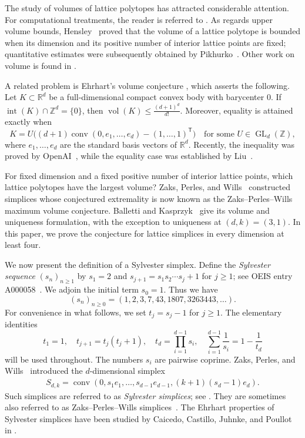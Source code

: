 \documentclass[reqno, 11pt]{article}
\numberwithin{equation}{section}
\theoremstyle{definition}
\DeclareMathOperator{\conv}{conv}
\begin{document}
The study of volumes of lattice polytopes has attracted considerable
attention. For computational treatments, the reader is referred to
\cite{BBCVVolum,DeLoera}.
As regards upper volume bounds, Hensley~\cite[Theorem~3.6]{Hensley1983}
proved that the volume of a lattice polytope is bounded when its
dimension and its positive number of interior lattice points are fixed;
quantitative estimates were subsequently obtained by
Pikhurko~\cite{Pikhurko2001}.
Other work on volume is found in \cite{Bau25,Nill07}.

A related problem is Ehrhart's volume conjecture
\cite{EhrhartVolume,BNillPaffenhonlz}, which asserts the following.
Let $K\subset\mathbb R^d$ be a full-dimensional compact convex body
with barycenter $0$. If $\operatorname{int}(K)\cap\mathbb Z^d=\{0\}$,
then $\operatorname{vol}(K)\leq\frac{(d+1)^d}{d!}$.
Moreover, equality is attained exactly when 
\[
 K=U\bigl((d+1)\conv(0,e_1,\ldots,e_d)-(1,\ldots,1)^{\mathsf{T}}\bigr)
 \quad\text{for some }U\in\operatorname{GL}_d(\mathbb Z),
\]
where $e_1,\ldots,e_d$ are the standard basis vectors of $\mathbb R^d$.
Recently, the inequality was proved by
\mbox{OpenAI}~\cite[Chapter~8, Theorem~1.1]{OAI26}, while the equality case
was established by Liu~\cite[Theorem~1.3]{LiuJiHao}.

For fixed dimension and a fixed positive number of interior lattice
points, which lattice polytopes have the largest volume?
Zaks, Perles, and Wills~\cite{ZPW1982} constructed simplices whose
conjectured extremality is now known as the Zaks--Perles--Wills maximum
volume conjecture.
Balletti and Kasprzyk~\cite[Conjecture~1.5]{BK2016} give its volume and
uniqueness formulation, with the exception to uniqueness at
$(d,k)=(3,1)$.
In this paper, we prove the conjecture for lattice simplices in every
dimension at least four.

We now present the definition of a Sylvester simplex. Define the
\emph{Sylvester sequence} $(s_n)_{n\geq1}$ by $s_1=2$ and
$s_{j+1}=s_1s_2\cdots s_j+1$ for $j\geq1$; see OEIS entry
A000058~\cite{Sloane23}. We adjoin the initial term $s_0=1$. Thus we have
\[
 (s_n)_{n\geq0}=(1,2,3,7,43,1807,3263443,\ldots).
\]
For convenience in what follows, we set $t_j=s_j-1$ for $j\geq1$.
The elementary identities
\begin{equation}\label{intro:eq:sylvester}
 t_1=1,\quad t_{j+1}=t_j(t_j+1),\quad
 t_d=\prod_{i=1}^{d-1}s_i,\quad
 \sum_{i=1}^{d-1}\frac1{s_i}=1-\frac1{t_d}
\end{equation}
will be used throughout. The numbers $s_i$ are pairwise coprime.
Zaks, Perles, and Wills~\cite{ZPW1982} introduced the $d$-dimensional
simplex
\begin{align*}
 S_{d,k}=\operatorname{conv}
 (0,s_1e_1,\ldots,s_{d-1}e_{d-1},(k+1)(s_d-1)e_d).
\end{align*}
Such simplices are referred to as \emph{Sylvester simplices};
see \cite{CCJP2026}. They are sometimes also referred to as
Zaks--Perles--Wills simplices~\cite{ALocal}.
The Ehrhart properties of Sylvester simplices have been studied by
Caicedo, Castillo, Juhnke, and Poullot in \cite{CCJP2026}.
\end{document}
